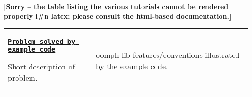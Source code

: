 \begin{center}
\bf
[Sorry -- the table listing the various tutorials cannot be rendered properly i#n
latex; please consult the html-based documentation.]
\end{center}


\label{_problems}%


 \tabulinesep=1mm
\begin{longtabu} spread 0pt [c]{*{2}{|X[-1]}|}
\hline
\href{#}{\tt {\bfseries Problem solved by example code}}

Short description of problem.  &
\begin{DoxyItemize}
\item {\ttfamily oomph-\/lib} features/conventions illustrated by the example code.   
\end{DoxyItemize}\\
\end{longtabu}
 \tabulinesep=1mm
